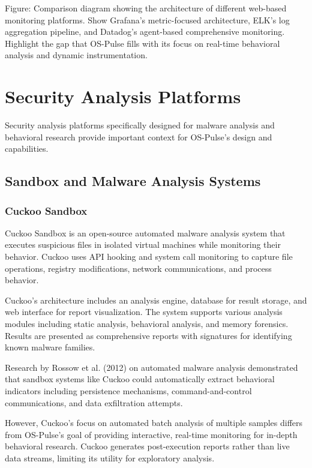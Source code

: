 {{Figure: Comparison diagram showing the architecture of different web-based monitoring platforms. Show Grafana's metric-focused architecture, ELK's log aggregation pipeline, and Datadog's agent-based comprehensive monitoring. Highlight the gap that OS-Pulse fills with its focus on real-time behavioral analysis and dynamic instrumentation.}}

\section{Security Analysis Platforms}

Security analysis platforms specifically designed for malware analysis and behavioral research provide important context for OS-Pulse's design and capabilities.

\subsection{Sandbox and Malware Analysis Systems}

\subsubsection{Cuckoo Sandbox}
Cuckoo Sandbox is an open-source automated malware analysis system that executes suspicious files in isolated virtual machines while monitoring their behavior. Cuckoo uses API hooking and system call monitoring to capture file operations, registry modifications, network communications, and process behavior.

Cuckoo's architecture includes an analysis engine, database for result storage, and web interface for report visualization. The system supports various analysis modules including static analysis, behavioral analysis, and memory forensics. Results are presented as comprehensive reports with signatures for identifying known malware families.

Research by Rossow et al. (2012) on automated malware analysis demonstrated that sandbox systems like Cuckoo could automatically extract behavioral indicators including persistence mechanisms, command-and-control communications, and data exfiltration attempts.

However, Cuckoo's focus on automated batch analysis of multiple samples differs from OS-Pulse's goal of providing interactive, real-time monitoring for in-depth behavioral research. Cuckoo generates post-execution reports rather than live data streams, limiting its utility for exploratory analysis.

